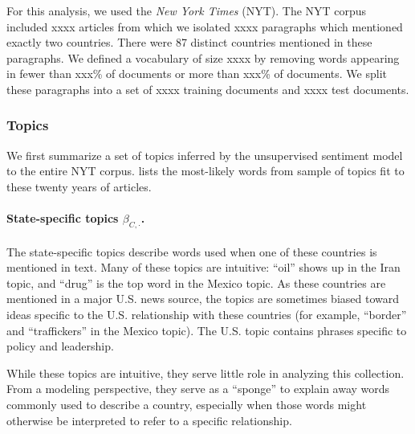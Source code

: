 For this analysis, we used the \emph{New York Times}
(NYT).  The NYT corpus included xxxx articles
from which we isolated xxxx paragraphs which mentioned exactly two
countries. There were 87 distinct countries mentioned in these
paragraphs.  We defined a vocabulary of size xxxx by removing words
appearing in fewer than xxx\% of documents or more than xxx\% of
documents.  We split these paragraphs into a set of xxxx training
documents and xxxx test documents.


\subsubsection*{Topics}
We first summarize a set of topics inferred by the unsupervised
sentiment model to the entire NYT corpus.
 lists the most-likely words
from sample of topics fit to these twenty years of articles.

\paragraph{State-specific topics $\beta_{C,\cdot}$.}  The
state-specific topics describe words used when one of these countries
is mentioned in text.  Many of these topics are intuitive: ``oil''
shows up in the Iran topic, and ``drug'' is the top word in the Mexico
topic.  As these countries are mentioned in a major U.S. news source,
the topics are sometimes biased toward ideas specific to the
U.S. relationship with these countries (for example, ``border'' and
``traffickers'' in the Mexico topic).  The U.S. topic contains phrases
specific to policy and leadership.

While these topics are intuitive, they serve little role in analyzing
this collection.  From a modeling perspective, they serve as a
``sponge'' to explain away words commonly used to describe a country,
especially when those words might otherwise be interpreted to refer to
a specific relationship.

